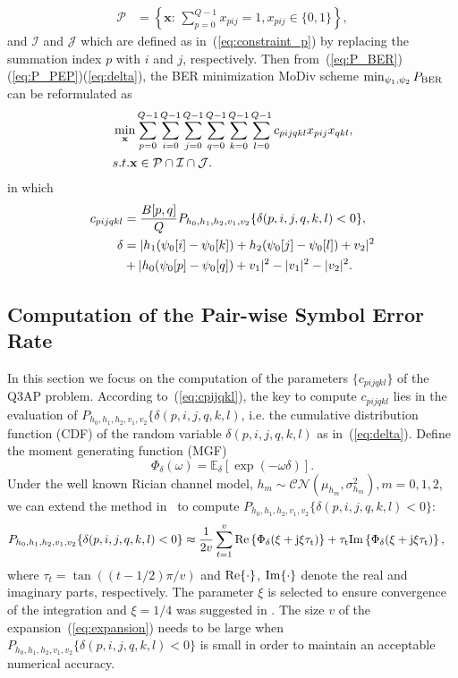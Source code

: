 \documentclass[journal,draftcls,onecolumn,12pt,twoside]{IEEEtran}
\newcommand{\BER}{\rm{BER}}
\renewcommand{\Re}{\rm Re}
\renewcommand{\Im}{\rm Im}
\begin{document}
\begin{align}
    \mathcal{P} & = \left\{\mathbf{x}:\,\sum_{p=0}^{Q-1}x_{pij} = 1,
    x_{pij}\in\{0, 1\}\right\}, \label{eq:constraint_p}
\end{align}
and $\mathcal{I}$ and $\mathcal{J}$ which are defined as
in~(\ref{eq:constraint_p}) by replacing the summation index $p$ with $i$ and
$j$, respectively. Then from~(\ref{eq:P_BER})(\ref{eq:P_PEP})(\ref{eq:delta}),
the BER minimization MoDiv scheme $\min_{\psi_1, \psi_2}P_{\BER}$ can be
reformulated as
\begin{align}
    & \min_{\mathbf{x}}\sum_{p=0}^{Q-1}\sum_{i=0}^{Q-1}\sum_{j=0}^{Q-1}
    \sum_{q=0}^{Q-1}\sum_{k=0}^{Q-1}\sum_{l=0}^{Q-1}c_{pijqkl}x_{pij}x_{qkl},
    \label{eq:Q3AP}\\
    & \mbox{s.t. } \mathbf{x}\in \mathcal{P}\cap\mathcal{I}\cap\mathcal{J}.
    \notag
\end{align}
in which
\begin{align}
    c_{pijqkl} & = \frac{B[p, q]}{Q}P_{h_0,h_1,h_2,v_1,v_2}\{\delta(p,i,j,q,k,l)
    < 0\},
    \label{eq:cpijqkl} \\
    \delta & = |h_1(\psi_0[i] - \psi_0[k])+h_2(\psi_0[j] - \psi_0[l])+v_2|^2 
 \notag
    \\
    &
       + |h_0(\psi_0[p] - \psi_0[q]) + v_1|^2 - |v_1|^2 -
    |v_2|^2.\label{eq:delta_pijqkl}
\end{align}

\subsection{Computation of the Pair-wise Symbol Error Rate}

In this section we focus on the computation of the parameters $\{c_{pijqkl}\}$
of the Q3AP problem. According to~(\ref{eq:cpijqkl}), the key to compute
$c_{pijqkl}$ lies in the evaluation of
$P_{h_0,h_1,h_2,v_1,v_2}\{\delta(p,i,j,q,k,l)$, i.e. the cumulative distribution
function (CDF) of the random variable $\delta(p,i,j,q,k,l)$ as
in~(\ref{eq:delta}). Define the moment generating function (MGF)
\[\Phi_{\delta}(\omega) = \mathbb{E}_{\delta}[\exp(-\omega\delta)].\]
Under the well known Rician channel model, 
$h_m\sim\mathcal{CN}(\mu_{h_m},\sigma_{h_m}^2), m=0,1,2$, we 
can extend the method
in~\cite{harvind2005symbol, taricco2002exact} to compute
$P_{h_0,h_1,h_2,v_1,v_2}\{\delta(p,i,j,q,k,l) < 0\}$:
\begin{align}
    & P_{h_0,h_1,h_2,v_1,v_2}\{\delta(p,i,j,q,k,l) < 0\} \approx
    \frac{1}{2v}\sum_{t=1}^v \Re\left\{\Phi_{\delta}(\xi + j\xi\tau_t)\right\} +
    \tau_t\Im\left\{\Phi_{\delta}(\xi + j\xi\tau_t)\right\},
    \label{eq:expansion}
\end{align}
where $\tau_t = \tan((t- 1/2)\pi/v)$
and $\Re\{\cdot\}$, $\Im\{\cdot\}$ denote the real and imaginary parts,
respectively. 
The parameter $\xi$ is selected to ensure convergence of the
integration and $\xi = 1/4$ was suggested in \cite{taricco2002exact}. The
size $v$ of the expansion~(\ref{eq:expansion}) needs to be large when $
P_{h_0,h_1,h_2,v_1,v_2}\{\delta(p,i,j,q,k,l) < 0\}$ is small in order to
maintain an acceptable numerical accuracy.
\end{document}
